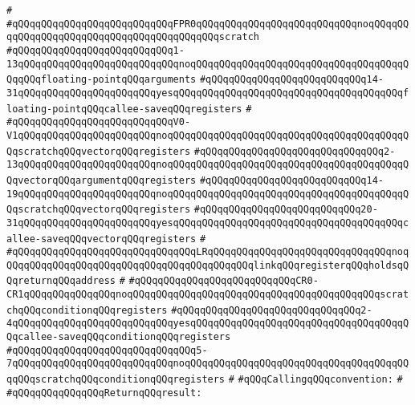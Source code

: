 \verb|#|\newline
\verb|#qQQqqQQqqQQqqQQqqQQqqQQqqQQqFPR0qQQqqQQqqQQqqQQqqQQqqQQqqQQqnoqQQqqQQqqQQqqQQqqQQqqQQqqQQqqQQqqQQqqQQqqQQqscratch|\newline
\verb|#qQQqqQQqqQQqqQQqqQQqqQQqqQQq1-13qQQqqQQqqQQqqQQqqQQqqQQqqQQqnoqQQqqQQqqQQqqQQqqQQqqQQqqQQqqQQqqQQqqQQqqQQqfloating-pointqQQqarguments|\newline
\verb|#qQQqqQQqqQQqqQQqqQQqqQQqqQQq14-31qQQqqQQqqQQqqQQqqQQqqQQqyesqQQqqQQqqQQqqQQqqQQqqQQqqQQqqQQqqQQqqQQqfloating-pointqQQqcallee-saveqQQqregisters|\newline
\verb|#|\newline
\verb|#qQQqqQQqqQQqqQQqqQQqqQQqqQQqV0-V1qQQqqQQqqQQqqQQqqQQqqQQqnoqQQqqQQqqQQqqQQqqQQqqQQqqQQqqQQqqQQqqQQqqQQqscratchqQQqvectorqQQqregisters|\newline
\verb|#qQQqqQQqqQQqqQQqqQQqqQQqqQQqqQQq2-13qQQqqQQqqQQqqQQqqQQqqQQqnoqQQqqQQqqQQqqQQqqQQqqQQqqQQqqQQqqQQqqQQqqQQqvectorqQQqargumentqQQqregisters|\newline
\verb|#qQQqqQQqqQQqqQQqqQQqqQQqqQQq14-19qQQqqQQqqQQqqQQqqQQqqQQqnoqQQqqQQqqQQqqQQqqQQqqQQqqQQqqQQqqQQqqQQqqQQqscratchqQQqvectorqQQqregisters|\newline
\verb|#qQQqqQQqqQQqqQQqqQQqqQQqqQQq20-31qQQqqQQqqQQqqQQqqQQqqQQqyesqQQqqQQqqQQqqQQqqQQqqQQqqQQqqQQqqQQqqQQqcallee-saveqQQqvectorqQQqregisters|\newline
\verb|#|\newline
\verb|#qQQqqQQqqQQqqQQqqQQqqQQqqQQqqQQqLRqQQqqQQqqQQqqQQqqQQqqQQqqQQqqQQqnoqQQqqQQqqQQqqQQqqQQqqQQqqQQqqQQqqQQqqQQqqQQqlinkqQQqregisterqQQqholdsqQQqreturnqQQqaddress|\newline
\verb|#|\newline
\verb|#qQQqqQQqqQQqqQQqqQQqqQQqqQQqCR0-CR1qQQqqQQqqQQqqQQqnoqQQqqQQqqQQqqQQqqQQqqQQqqQQqqQQqqQQqqQQqqQQqscratchqQQqconditionqQQqregisters|\newline
\verb|#qQQqqQQqqQQqqQQqqQQqqQQqqQQqqQQq2-4qQQqqQQqqQQqqQQqqQQqqQQqqQQqyesqQQqqQQqqQQqqQQqqQQqqQQqqQQqqQQqqQQqqQQqcallee-saveqQQqconditionqQQqregisters|\newline
\verb|#qQQqqQQqqQQqqQQqqQQqqQQqqQQqqQQq5-7qQQqqQQqqQQqqQQqqQQqqQQqqQQqnoqQQqqQQqqQQqqQQqqQQqqQQqqQQqqQQqqQQqqQQqqQQqscratchqQQqconditionqQQqregisters|\newline
\verb|#|\newline
\verb|#qQQqCallingqQQqconvention:|\newline
\verb|#|\newline
\verb|#qQQqqQQqqQQqqQQqReturnqQQqresult:|\newline
